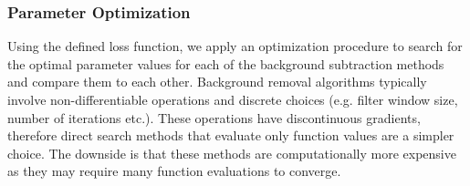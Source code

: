 \documentclass[iucr,review]{iucrjournals}
\begin{document}


%


\subsubsection{Parameter Optimization}

Using the defined loss function, we apply an optimization procedure to search for the optimal
parameter values for each of the background subtraction methods and compare them to each other.
Background removal algorithms typically involve non-differentiable operations
and discrete choices (e.g. filter window size, number of iterations etc.).
These operations have discontinuous gradients, therefore
direct search methods that evaluate only function values are a simpler choice. 
The downside is that these methods are computationally more expensive
as they may require many function evaluations to converge.
\end{document}
